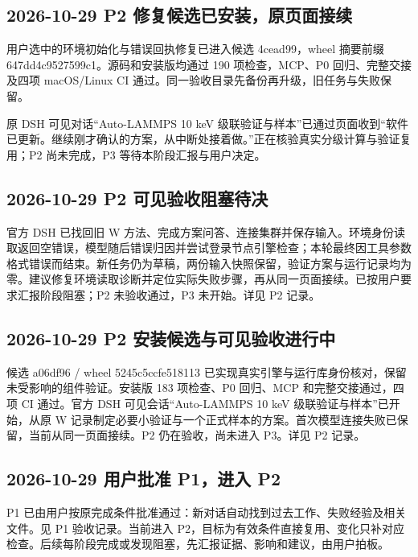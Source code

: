 \documentclass[11pt,a4paper]{ctexart}
\begin{document}
\subsection{2026-10-29 P2 修复候选已安装，原页面接续}


用户选中的环境初始化与错误回执修复已进入候选 4cead99，wheel 摘要前缀 647dd4c9527599c1。源码和安装版均通过 190 项检查，MCP、P0 回归、完整交接及四项 macOS/\allowbreak{}Linux CI 通过。同一验收目录先备份再升级，旧任务与失败保留。



原 DSH 可见对话“Auto-LAMMPS 10 keV 级联验证与样本”已通过页面收到“软件已更新。继续刚才确认的方案，从中断处接着做。”正在核验真实分级计算与验证复用；P2 尚未完成，P3 等待本阶段汇报与用户决定。



\subsection{2026-10-29 P2 可见验收阻塞待决}


官方 DSH 已找回旧 W 方法、完成方案问答、连接集群并保存输入。环境身份读取返回空错误，模型随后错误归因并尝试登录节点引擎检查；本轮最终因工具参数格式错误而结束。新任务仍为草稿，两份输入快照保留，验证方案与运行记录均为零。建议修复环境读取诊断并定位实际失败步骤，再从同一页面接续。已按用户要求汇报阶段阻塞；P2 未验收通过，P3 未开始。详见 P2 记录。



\subsection{2026-10-29 P2 安装候选与可见验收进行中}


候选 a06df96 /\allowbreak{} wheel 5245c5ccfe518113 已实现真实引擎与运行库身份核对，保留未受影响的组件验证。安装版 183 项检查、P0 回归、MCP 和完整交接通过，四项 CI 通过。官方 DSH 可见会话“Auto-LAMMPS 10 keV 级联验证与样本”已开始，从原 W 记录制定必要小验证与一个正式样本的方案。首次模型连接失败已保留，当前从同一页面接续。P2 仍在验收，尚未进入 P3。详见 P2 记录。



\subsection{2026-10-29 用户批准 P1，进入 P2}


P1 已由用户按原完成条件批准通过：新对话自动找到过去工作、失败经验及相关文件。见 P1 验收记录。当前进入 P2，目标为有效条件直接复用、变化只补对应检查。后续每阶段完成或发现阻塞，先汇报证据、影响和建议，由用户拍板。
\end{document}
